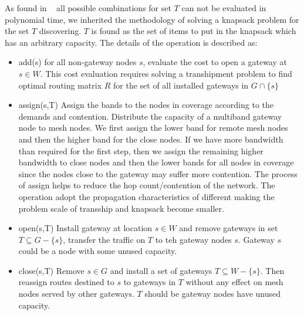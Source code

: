    As found in ~\cite{robinson2008adding} all possible combinations for set $T$ can not be evaluated in polynomial time, we inherited the methodology of solving a knapsack problem for the set $T$ discovering. $T$ is found as the set of items to put in the knapsack which has an arbitrary capacity.
   The details of the operation is described as:



   \begin{itemize}
   \item add(s) for all non-gateway nodes $s$, evaluate the cost to open a gateway at $s \in W$. This cost evaluation requires solving a transhipment problem to find optimal routing matrix $R$ for the set of all installed gateways in $G \cap \{s\}$
   \item assign(s,T) Assign the bands to the nodes in coverage according to the demands and contention. Distribute the capacity of a multiband gateway node to mesh nodes. 
    We first assign the lower band for remote mesh nodes and then the higher band for the close nodes. If we have more bandwidth than required for the first step, then we assign the remaining higher bandwidth to close nodes and then the lower bands for all nodes in coverage since the nodes close to the gateway may suffer more contention. The process of assign helps to reduce the hop count/contention of the network.
   The operation adopt the propagation characteristics of different making the problem scale of transship and knapsack become smaller.
   \item open(s,T) Install gateway at location $s \in W$ and remove gateways in set $T \subseteq G-\{s\}$, transfer the traffic on $T$ to teh gateway nodes $s$. Gateway $s$ could be a node with some unused capacity.
   \item close(s,T) Remove $s \in G$ and install a set of gateways $T \subseteq W-\{s\}$. Then reassign routes destined to $s$ to gateways in $T$ without any effect on mesh nodes served by other gateways. $T$ should be gateway nodes have unused capacity.
   \end{itemize}


